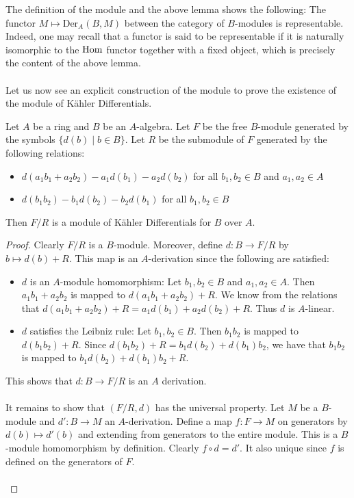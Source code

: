 \documentclass[a4paper]{article}
\begin{document}
The definition of the module and the above lemma shows the following: The functor $M\mapsto\text{Der}_A(B,M)$ between the category of $B$-modules is representable. Indeed, one may recall that a functor is said to be representable if it is naturally isomorphic to the $\operatorname{Hom}$ functor together with a fixed object, which is precisely the content of the above lemma. \\~\\

Let us now see an explicit construction of the module to prove the existence of the module of Kähler Differentials. 

\begin{prp}{}{} Let $A$ be a ring and $B$ be an $A$-algebra. Let $F$ be the free $B$-module generated by the symbols $\{d(b)\;|\;b\in B\}$. Let $R$ be the submodule of $F$ generated by the following relations: 
\begin{itemize}
\item $d(a_1b_1+a_2b_2)-a_1d(b_1)-a_2d(b_2)$ for all $b_1,b_2\in B$ and $a_1,a_2\in A$
\item $d(b_1b_2)-b_1d(b_2)-b_2d(b_1)$ for all $b_1,b_2\in B$
\end{itemize}
Then $F/R$ is a module of Kähler Differentials for $B$ over $A$. \tcbline
\begin{proof}
Clearly $F/R$ is a $B$-module. Moreover, define $d:B\to F/R$ by $b\mapsto d(b)+R$. This map is an $A$-derivation since the following are satisfied: 
\begin{itemize}
\item $d$ is an $A$-module homomorphism: Let $b_1,b_2\in B$ and $a_1,a_2\in A$. Then $a_1b_1+a_2b_2$ is mapped to $d(a_1b_1+a_2b_2)+R$. We know from the relations that $d(a_1b_1+a_2b_2)+R=a_1d(b_1)+a_2d(b_2)+R$. Thus $d$ is $A$-linear. 
\item $d$ satisfies the Leibniz rule: Let $b_1,b_2\in B$. Then $b_1b_2$ is mapped to $d(b_1b_2)+R$. Since $d(b_1b_2)+R=b_1d(b_2)+d(b_1)b_2$, we have that $b_1b_2$ is mapped to $b_1d(b_2)+d(b_1)b_2+R$. 
\end{itemize}
This shows that $d:B\to F/R$ is an $A$ derivation. \\~\\

It remains to show that $(F/R,d)$ has the universal property. Let $M$ be a $B$-module and $d':B\to M$ an $A$-derivation. Define a map $f:F\to M$ on generators by $d(b)\mapsto d'(b)$ and extending from generators to the entire module. This is a $B$-module homomorphism by definition. Clearly $f\circ d=d'$. It also unique since $f$ is defined on the generators of $F$. \\~\\


\end{proof}
\end{prp}
\end{document}
